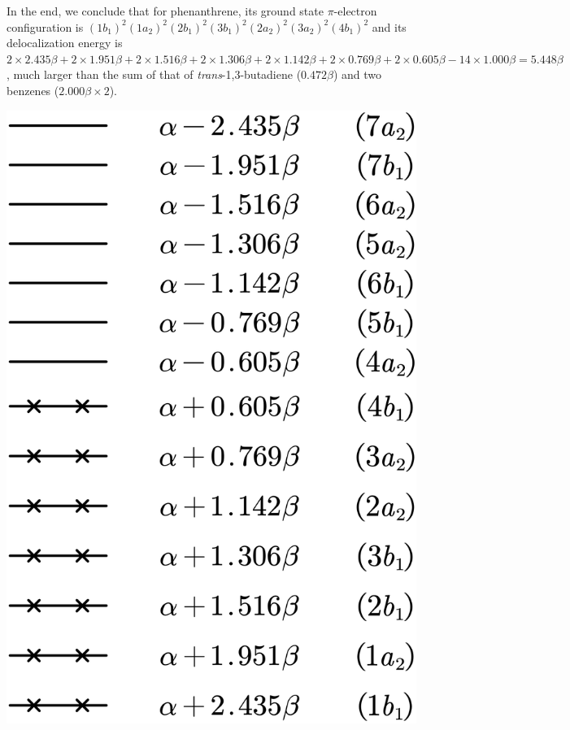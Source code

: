 \documentclass[a4paper]{book}
\begin{document}
\begin{solution}
\begin{enumerate}[label=(\alph*)]
		In the end, we conclude that for phenanthrene, its ground state $\pi$-electron configuration is $(1b_1)^2 (1a_2)^2 (2b_1)^2 (3b_1)^2 (2a_2)^2 (3a_2)^2 (4b_1)^2$ and its delocalization energy is $2 \times 2.435 \beta + 2 \times 1.951 \beta + 2 \times 1.516 \beta + 2 \times 1.306 \beta + 2 \times 1.142 \beta + 2 \times 0.769 \beta + 2 \times 0.605 \beta - 14 \times 1.000 \beta = 5.448 \beta$, much larger than the sum of that of {\it trans}-1,3-butadiene ($0.472\beta$) and two benzenes ($2.000\beta \times 2$). 
		
		\begin{center}
		\includegraphics[scale=1.0]{./structures/exercise_1/phenanthrene/998.png}
		\end{center}
		
		
	\end{enumerate}	
		
	\end{solution}
\end{document}
